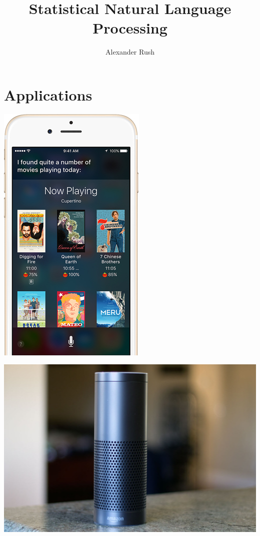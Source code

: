 \documentclass{beamer}
\title{Statistical Natural Language Processing}
\author{Alexander Rush}
\begin{document}
\begin{frame}
  \titlepage
\end{frame}

\section{Applications}

{

}

\begin{frame}
  \begin{center}
    \includegraphics{siri}
  \end{center}
\end{frame}

\begin{frame}
  \begin{center}
    \includegraphics[height=\textheight]{echo}
  \end{center}
\end{frame}
\end{document}
